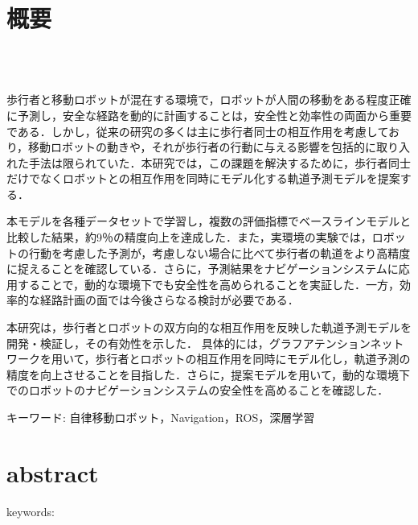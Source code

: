 \chapter*{概要}
\thispagestyle{empty}
%
\begin{center}
  \scalebox{1.5}{移動ロボットのための深層学習を用いた}\\
  \scalebox{1.5}{歩行者の位置予測とナビゲーションへの応用}\\
\end{center}
\vspace{1.0zh}
%

歩行者と移動ロボットが混在する環境で，ロボットが人間の移動をある程度正確に予測し，安全な経路を動的に計画することは，安全性と効率性の両面から重要である．しかし，従来の研究の多くは主に歩行者同士の相互作用を考慮しており，移動ロボットの動きや，それが歩行者の行動に与える影響を包括的に取り入れた手法は限られていた．本研究では，この課題を解決するために，歩行者同士だけでなくロボットとの相互作用を同時にモデル化する軌道予測モデルを提案する．

本モデルを各種データセットで学習し，複数の評価指標でベースラインモデルと比較した結果，約9％の精度向上を達成した．また，実環境の実験では，ロボットの行動を考慮した予測が，考慮しない場合に比べて歩行者の軌道をより高精度に捉えることを確認している．さらに，予測結果をナビゲーションシステムに応用することで，動的な環境下でも安全性を高められることを実証した．一方，効率的な経路計画の面では今後さらなる検討が必要である．

本研究は，歩行者とロボットの双方向的な相互作用を反映した軌道予測モデルを開発・検証し，その有効性を示した．
具体的には，グラフアテンションネットワークを用いて，歩行者とロボットの相互作用を同時にモデル化し，軌道予測の精度を向上させることを目指した．さらに，提案モデルを用いて，動的な環境下でのロボットのナビゲーションシステムの安全性を高めることを確認した．

\vspace{1.0zh}
\begin{flushleft}
キーワード: 自律移動ロボット，Navigation，ROS，深層学習
\end{flushleft}
%
\newpage
\chapter*{abstract}
\thispagestyle{empty}
%
\begin{center}
  \scalebox{1.3}{title}
\end{center}
\vspace{1.0zh}
%


keywords:

